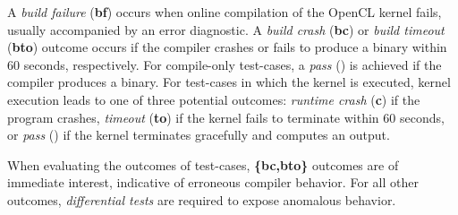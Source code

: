 
A \emph{build failure} (\textbf{bf}) occurs when online compilation of the OpenCL kernel fails, usually accompanied by an error diagnostic. A \emph{build crash} (\textbf{bc}) or \emph{build timeout} (\textbf{bto}) outcome occurs if the compiler crashes or fails to produce a binary within 60 seconds, respectively. For compile-only test-cases, a \emph{pass} (\textbf{\cmark}) is achieved if the compiler produces a binary. For test-cases in which the kernel is executed, kernel execution leads to one of three potential outcomes: \emph{runtime crash} (\textbf{c}) if the program crashes, \emph{timeout} (\textbf{to}) if the kernel fails to terminate within 60 seconds, or \emph{pass} (\textbf{\cmark}) if the kernel terminates gracefully and computes an output. 
%

When evaluating the outcomes of test-cases, \textbf{\{bc,bto\}} outcomes are of immediate interest, indicative of erroneous compiler behavior. For all other outcomes, \emph{differential tests} are required to expose anomalous behavior.


